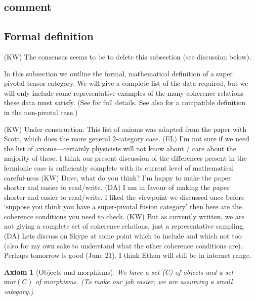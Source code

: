 \documentclass[12pt,a4paper]{article}
\newtheorem{axiom}[theorem]{Axiom}
\newcommand{\mor}{\text{mor}}
\newcommand{\obj}{\text{obj}}
\newcommand{\kw}[1]{{\color{kwcolor}\footnotesize{(KW) #1}}}
\newcommand{\dave}[1]{{\color{ao(english)}\footnotesize{(DA) #1}}}
\newcommand{\ethan}[1]{{\color{amethyst}\footnotesize{(EL) #1}}}
\begin{document}
 

 
\subsection{comment} %

\subsection{Formal definition}

\kw{The consensus seems to be to delete this subsection (see discussion below).}

In this subsection we outline the formal, mathematical definition of a super pivotal tensor category.
We will give a complete list of the data required, but we will only include some representative
examples of the many coherence relations these data must satisfy.
(See \cite{MW-in-prep} for full details.  See also \cite{xxxx} for a compatible definition in the non-pivotal case.)



\kw{Under construction.
This list of axioms was adapted from the paper with Scott, which does the more general
2-category case.}
\ethan{I'm not sure if we need the list of axioms---certainly physicists will not know about / care about the majority of these. I think our present discussion of the differences present in the fermionic case is sufficiently complete with its current level of mathematical careful-ness}
\kw{Dave, what do you think?  I'm happy to make the paper shorter and easier to read/write.}
\dave{I am in favour of making the paper shorter and easier to read/write.
I liked the viewpoint we discussed once before `suppose you think you have a super-pivotal fusion category' 
then here are the coherence conditions you need to check.}
\kw{But as currently written, we are not giving a complete set of coherence relations, just a 
representative sampling.}
\dave{Lets discuss on Skype at some point which to include and which not too  
(also for my own sake to understand what the other coherence conditions are).
Perhaps tomorrow is good (June 21), I think Ethan will still be in internet range.
}

\begin{axiom}[Objects and morphisms]
We have a set \obj(C) of objects and a set $\mor(C)$ of morphisms.
(To make our job easier, we are assuming a small category.)
\end{axiom}
\end{document}
